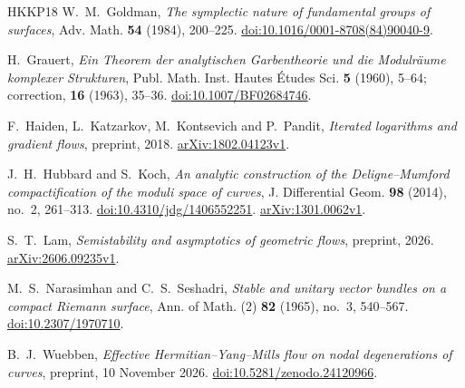 \begin{thebibliography}{HKKP18}
W.~M.~Goldman,
\emph{The symplectic nature of fundamental groups of surfaces},
Adv. Math. \textbf{54} (1984), 200--225.
\href{https://doi.org/10.1016/0001-8708(84)90040-9}{doi:10.1016/0001-8708(84)90040-9}.

H.~Grauert,
\emph{Ein Theorem der analytischen Garbentheorie und die Modulräume komplexer Strukturen},
Publ. Math. Inst. Hautes Études Sci. \textbf{5} (1960), 5--64;
correction, \textbf{16} (1963), 35--36.
\href{https://doi.org/10.1007/BF02684746}{doi:10.1007/BF02684746}.

F.~Haiden, L.~Katzarkov, M.~Kontsevich and P.~Pandit,
\emph{Iterated logarithms and gradient flows}, preprint, 2018.
\href{https://arxiv.org/abs/1802.04123v1}{arXiv:1802.04123v1}.

J.~H.~Hubbard and S.~Koch,
\emph{An analytic construction of the Deligne--Mumford compactification of the moduli space of curves},
J. Differential Geom. \textbf{98} (2014), no.~2, 261--313.
\href{https://doi.org/10.4310/jdg/1406552251}{doi:10.4310/jdg/1406552251}.
\href{https://arxiv.org/abs/1301.0062v1}{arXiv:1301.0062v1}.

S.~T.~Lam, \emph{Semistability and asymptotics of geometric flows},
preprint, 2026.
\href{https://arxiv.org/abs/2606.09235v1}{arXiv:2606.09235v1}.

M.~S.~Narasimhan and C.~S.~Seshadri,
\emph{Stable and unitary vector bundles on a compact Riemann surface},
Ann. of Math. (2) \textbf{82} (1965), no.~3, 540--567.
\href{https://doi.org/10.2307/1970710}{doi:10.2307/1970710}.

B.~J.~Wuebben, \emph{Effective Hermitian--Yang--Mills flow on nodal degenerations of curves},
preprint, 10 November 2026.
\href{https://doi.org/10.5281/zenodo.24120966}{doi:10.5281/zenodo.24120966}.
\end{thebibliography}
